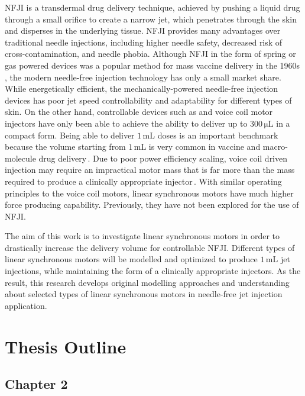         
    \acf{NFJI} is a transdermal drug delivery technique, achieved by pushing a liquid drug through a small orifice to create a narrow jet, which penetrates through the skin and disperses in the underlying tissue. \acs{NFJI} provides many advantages over traditional needle injections, including higher needle safety, decreased risk of cross-contamination, and needle phobia. Although \acs{NFJI} in the form of spring or gas powered devices was a popular method for mass vaccine delivery in the 1960s , the modern needle-free injection technology has only a small market share. While energetically efficient, the mechanically-powered needle-free injection devices has poor jet speed controllability and adaptability for different types of skin. On the other hand, controllable devices such as and voice coil motor injectors have only been able to achieve the ability to deliver up to $300\,\mathrm{\mu L}$ in a compact form. Being able to deliver $1\,\mathrm{mL}$ doses is an important benchmark because the volume starting from $1\,\mathrm{mL}$ is very common in vaccine and macro-molecule drug delivery\,\cite{Hogan2015a}. Due to poor power efficiency scaling, voice coil driven injection may require an impractical motor mass that is far more than the mass required to produce a clinically appropriate injector\,\cite{ruddy2014}. With similar operating principles to the voice coil motors, linear synchronous motors have much higher force producing capability. Previously, they have not been explored for the use of \acs{NFJI}.
    
    
    The aim of this work is to investigate linear synchronous motors in order to drastically increase the delivery volume for controllable \acs{NFJI}. Different types of linear synchronous motors will be modelled and optimized to produce $1\,\mathrm{mL}$ jet injections, while maintaining the form of a clinically appropriate injectors. As the result, this research develops original modelling approaches and understanding about selected types of linear synchronous motors in needle-free jet injection application.
    
    
\section{Thesis Outline}    \label{Chapter:intro/outline} 


    \subsection{Chapter 2}  \label{Chapter:intro/outline/chapter2}
    
